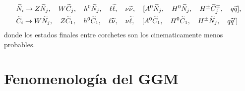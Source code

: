 \begin{align*}
  &\widetilde{N}_i \rightarrow Z \widetilde{N}_j, \quad W \widetilde{C}_j, \quad h^0 \widetilde{N}_j, \quad \ell \widetilde{\ell}, \quad \nu \widetilde{\nu}, \quad
  [A^0 \widetilde{N}_j, \quad H^0 \widetilde{N}_j, \quad H^{\pm} \widetilde{C}_j^{\mp}, \quad q \widetilde{q}], \\
  &\widetilde{C}_i \rightarrow W \widetilde{N}_j, \quad Z \widetilde{C}_1, \quad h^0 \widetilde{C}_1, \quad \ell \widetilde{\nu}, \quad \nu \widetilde{\ell}, \quad
  [A^0 \widetilde{C}_1, \quad H^0 \widetilde{C}_1, \quad H^{\pm} \widetilde{N}_j, \quad q \widetilde{q}']
\end{align*}
%
donde los estados finales entre corchetes son los cinematicamente menos probables.

















\section{Fenomenología del GGM}



